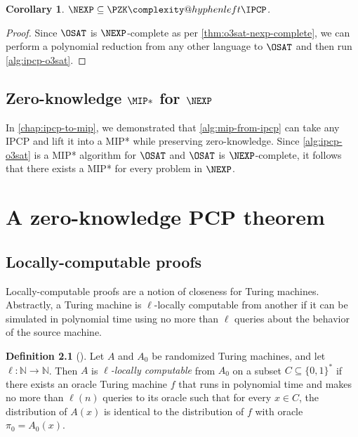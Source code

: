 \documentclass[english,12pt]{reedthesis}
\makeatletter
\theoremstyle{plain}
\newtheorem{cor}[cor]{Corollary}
\theoremstyle{definition}
\newtheorem{defn}[defn]{Definition}
\theoremstyle{remark}
\newcommand{\PZKIPCP}{%
  \PZK\complexity@hyphenleft\IPCP
}
\makeatother
\begin{document}
\begin{cor}\label{nexp-pzkipcp}
  $\NEXP \subseteq \PZKIPCP$.
\end{cor}

\begin{proof}
  Since $\OSAT$ is $\NEXP$-complete as per \cref{thm:o3sat-nexp-complete}, we
  can perform a polynomial reduction from any other language to $\OSAT$ and then
  run \cref{alg:ipcp-o3sat}.
\end{proof}

\section{Zero-knowledge $\MIP*$ for $\NEXP$}\label{sec:zk-mipstar-nexp}

In \cref{chap:ipcp-to-mip}, we demonstrated that \cref{alg:mip-from-ipcp} can
take any IPCP and lift it into a MIP* while preserving zero-knowledge. Since
\cref{alg:ipcp-o3sat} is a MIP* algorithm for $\OSAT$ and $\OSAT$ is
$\NEXP$-complete, it follows that there exists a MIP* for every problem in
$\NEXP$.

\chapter{A zero-knowledge PCP theorem}\label{chap:zk-pcp-theorem}

\section{Locally-computable proofs}\label{sec:loc-comp-proof}

Locally-computable proofs are a notion of closeness for Turing machines.
Abstractly, a Turing machine is $\ell$-locally computable from another if it can be
simulated in polynomial time using no more than $\ell$ queries about the behavior
of the source machine.

\begin{defn}[{\cite[Def.\ 3.1]{GOS25}}]\label{def:loc-comp}%
   Let $A$ and $A_{0}$ be randomized Turing
  machines, and let $\ell\colon \mathbb{N} \rightarrow \mathbb{N}$. Then $A$ is \emph{$\ell$-locally computable}
  from $A_{0}$ on a subset $C \subseteq \{0, 1\}^{*}$ if there exists an oracle Turing
  machine $f$ that runs in polynomial time and makes no more than $\ell(n)$ queries
  to its oracle such that for every $x \in C$, the distribution of $A(x)$ is
  identical to the distribution of $f$ with oracle $\pi_{0} = A_{0}(x)$.
\end{defn}
\end{document}

